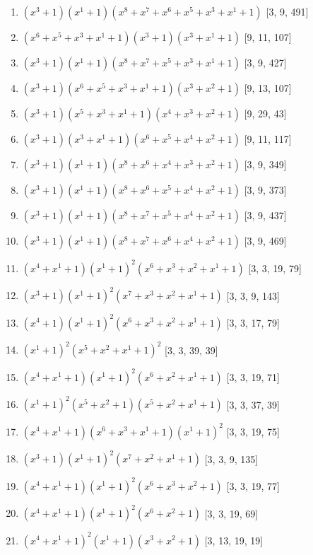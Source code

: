 \documentclass[10pt,twocolumn]{article}
\begin{document}
\begin{enumerate}
\item $(x^{3} + 1)(x^{1} + 1)(x^{8} + x^{7} + x^{6} + x^{5} + x^{3} + x^{1} + 1)$  [3, 9, 491]
\item $(x^{6} + x^{5} + x^{3} + x^{1} + 1)(x^{3} + 1)(x^{3} + x^{1} + 1)$  [9, 11, 107]
\item $(x^{3} + 1)(x^{1} + 1)(x^{8} + x^{7} + x^{5} + x^{3} + x^{1} + 1)$  [3, 9, 427]
\item $(x^{3} + 1)(x^{6} + x^{5} + x^{3} + x^{1} + 1)(x^{3} + x^{2} + 1)$  [9, 13, 107]
\item $(x^{3} + 1)(x^{5} + x^{3} + x^{1} + 1)(x^{4} + x^{3} + x^{2} + 1)$  [9, 29, 43]
\item $(x^{3} + 1)(x^{3} + x^{1} + 1)(x^{6} + x^{5} + x^{4} + x^{2} + 1)$  [9, 11, 117]
\item $(x^{3} + 1)(x^{1} + 1)(x^{8} + x^{6} + x^{4} + x^{3} + x^{2} + 1)$  [3, 9, 349]
\item $(x^{3} + 1)(x^{1} + 1)(x^{8} + x^{6} + x^{5} + x^{4} + x^{2} + 1)$  [3, 9, 373]
\item $(x^{3} + 1)(x^{1} + 1)(x^{8} + x^{7} + x^{5} + x^{4} + x^{2} + 1)$  [3, 9, 437]
\item $(x^{3} + 1)(x^{1} + 1)(x^{8} + x^{7} + x^{6} + x^{4} + x^{2} + 1)$  [3, 9, 469]
\item $(x^{4} + x^{1} + 1)(x^{1} + 1)^{2}(x^{6} + x^{3} + x^{2} + x^{1} + 1)$  [3, 3, 19, 79]
\item $(x^{3} + 1)(x^{1} + 1)^{2}(x^{7} + x^{3} + x^{2} + x^{1} + 1)$  [3, 3, 9, 143]
\item $(x^{4} + 1)(x^{1} + 1)^{2}(x^{6} + x^{3} + x^{2} + x^{1} + 1)$  [3, 3, 17, 79]
\item $(x^{1} + 1)^{2}(x^{5} + x^{2} + x^{1} + 1)^{2}$  [3, 3, 39, 39]
\item $(x^{4} + x^{1} + 1)(x^{1} + 1)^{2}(x^{6} + x^{2} + x^{1} + 1)$  [3, 3, 19, 71]
\item $(x^{1} + 1)^{2}(x^{5} + x^{2} + 1)(x^{5} + x^{2} + x^{1} + 1)$  [3, 3, 37, 39]
\item $(x^{4} + x^{1} + 1)(x^{6} + x^{3} + x^{1} + 1)(x^{1} + 1)^{2}$  [3, 3, 19, 75]
\item $(x^{3} + 1)(x^{1} + 1)^{2}(x^{7} + x^{2} + x^{1} + 1)$  [3, 3, 9, 135]
\item $(x^{4} + x^{1} + 1)(x^{1} + 1)^{2}(x^{6} + x^{3} + x^{2} + 1)$  [3, 3, 19, 77]
\item $(x^{4} + x^{1} + 1)(x^{1} + 1)^{2}(x^{6} + x^{2} + 1)$  [3, 3, 19, 69]
\item $(x^{4} + x^{1} + 1)^{2}(x^{1} + 1)(x^{3} + x^{2} + 1)$  [3, 13, 19, 19]

\end{enumerate}
\end{document}
